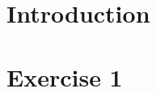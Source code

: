 \documentclass[a4paper,11pt]{article}
\begin{document}


\section{Introduction}


\section{Exercise 1}


%

%

%

%
\end{document}
